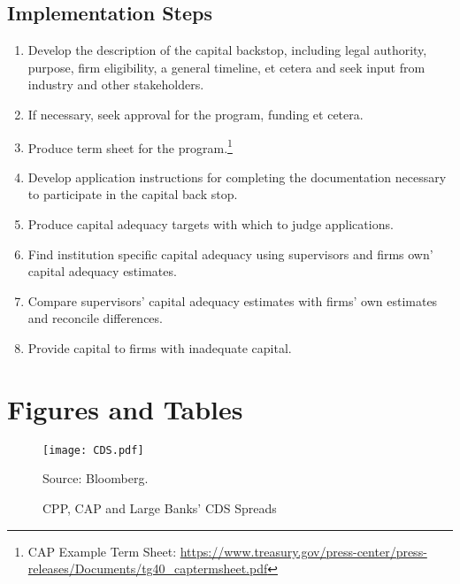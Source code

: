 \documentclass[12pt]{article}
\begin{document}
\subsection{Implementation Steps}

\begin{enumerate}

\item Develop the description of the capital backstop, including legal authority, purpose, firm eligibility, a general timeline, et cetera and seek input from industry and other stakeholders.
\item If necessary, seek approval for the program, funding et cetera.
\item Produce term sheet for the program.\footnote{CAP Example Term Sheet: \newline \url{https://www.treasury.gov/press-center/press-releases/Documents/tg40_captermsheet.pdf}}
\item Develop application instructions for completing the documentation necessary to participate in the capital back stop.
\item Produce capital adequacy targets with which to judge applications.
\item Find institution specific capital adequacy using supervisors and firms own' capital adequacy estimates. 
\item Compare supervisors' capital adequacy estimates with firms' own estimates and reconcile differences.
\item Provide capital to firms with inadequate capital. 

\end{enumerate}

\newpage
\section{Figures and Tables}

\begin{figure}[h]
\caption{CPP, CAP and Large Banks' CDS Spreads}\label{figure1}
\centering
\texttt{[image: CDS.pdf]}
\raggedright
\footnotesize Source: Bloomberg.
\end{figure}
\end{document}
